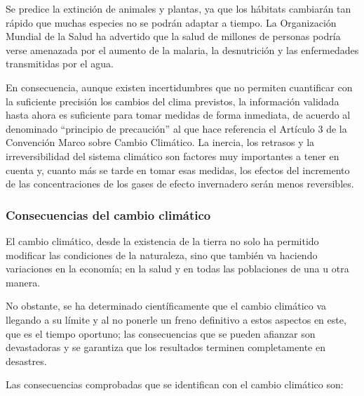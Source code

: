 Se predice la extinción de animales y plantas, ya que los hábitats cambiarán tan
rápido que muchas especies no se podrán adaptar a tiempo. La Organización Mundial
de la Salud ha advertido que la salud de millones de personas podría verse amenazada
por el aumento de la malaria, la desnutrición y las enfermedades transmitidas por el
agua.

En consecuencia, aunque existen incertidumbres que no permiten cuantificar con
la suficiente precisión los cambios del clima previstos, la información validada hasta
ahora es suficiente para tomar medidas de forma inmediata, de acuerdo al denominado
``principio de precaución'' al que hace referencia el Artículo 3 de la Convención Marco
sobre Cambio Climático. La inercia, los retrasos y la irreversibilidad del sistema
climático son factores muy importantes a tener en cuenta y, cuanto más se tarde en
tomar esas medidas, los efectos del incremento de las concentraciones de los gases de
efecto invernadero serán menos reversibles.

\subsubsection{Consecuencias del cambio climático}
El cambio climático, desde la existencia de la tierra no solo ha permitido
modificar las condiciones de la naturaleza, sino que también va haciendo variaciones
en la economía; en la salud y en todas las poblaciones de una u otra manera.

No obstante, se ha determinado científicamente que el cambio climático va
llegando a su límite y al no ponerle un freno definitivo a estos aspectos en este, que es
el tiempo oportuno; las consecuencias que se pueden afianzar son devastadoras y se
garantiza que los resultados terminen completamente en desastres.

Las consecuencias comprobadas que se identifican con el cambio
climático son:

